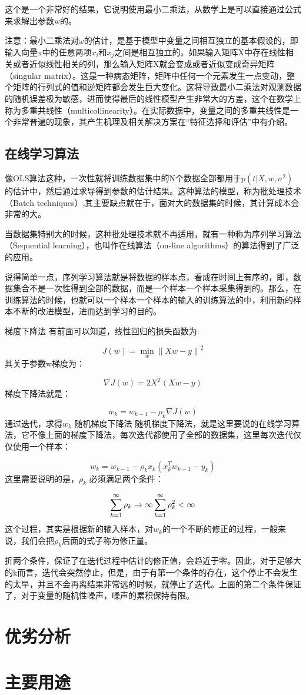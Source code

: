 \documentclass[12pt,a4paper,draft]{ctexart}
\begin{document}
这个是一个非常好的结果，它说明使用最小二乘法，从数学上是可以直接通过公式来求解出参数w的。

注意：最小二乘法对$ \omega $的估计，是基于模型中变量之间相互独立的基本假设的，即输入向量x中的任意两项$ x_{i} $和$ x_{j} $之间是相互独立的。如果输入矩阵X中存在线性相关或者近似线性相关的列，那么输入矩阵X就会变成或者近似变成奇异矩阵（singular matrix）。这是一种病态矩阵，矩阵中任何一个元素发生一点变动，整个矩阵的行列式的值和逆矩阵都会发生巨大变化。这将导致最小二乘法对观测数据的随机误差极为敏感，进而使得最后的线性模型产生非常大的方差，这个在数学上称为多重共线性（multicollinearity）。在实际数据中，变量之间的多重共线性是一个非常普遍的现象，其产生机理及相关解决方案在“特征选择和评估”中有介绍。
\subsection{在线学习算法}
像OLS算法这种，一次性就将训练数据集中的N个数据全部都用于$ p(t|X,w,\sigma^2) $的估计中，然后通过求导得到参数的估计结果。这种算法的模型，称为批处理技术（Batch techniques）,其主要缺点就在于，面对大的数据集的时候，其计算成本会非常的大。

当数据集特别大的时候，这种批处理技术就不再适用，就有一种称为序列学习算法（Sequential learning），也叫作在线算法（on-line algorithms）的算法得到了广泛的应用。

说得简单一点，序列学习算法就是将数据的样本点，看成在时间上有序的，即，数据集合不是一次性得到全部的数据，而是一个样本一个样本采集得到的。那么，在训练算法的时候，也就可以一个样本一个样本的输入的训练算法的中，利用新的样本不断的改进模型，进而达到学习的目的。

梯度下降法
有前面可以知道，线性回归的损失函数为:

\[ J(w)=\min_{w}\left \| Xw-y \right \|^{2} \]
其关于参数w梯度为：

\[ \nabla J(w)=2X^T(Xw-y) \]
梯度下降法就是：

\[ w_{k} = w_{k-1}- \rho_{k} \nabla J(w) \]
通过迭代，求得$ w_{k} $
随机梯度下降法
随机梯度下降法，就是这里要说的在线学习算法，它不像上面的梯度下降法，每次迭代都使用了全部的数据集，这里每次迭代仅仅使用一个样本：

\[ w_{k} = w_{k-1}- \rho_{k} x_{k}(x_{k}^Tw_{k-1} - y_{k}) \]
这里需要说明的是，$ \rho_{k} $ 必须满足两个条件：

\[ \sum_{k=1}^{\infty}\rho_{k}\to\infty \\
\sum_{k=1}^{\infty}\rho_{k}^2 < \infty \]
这个过程，其实是根据新的输入样本，$ 对w_{k} $的一个不断的修正的过程，一般来说，我们会把$ \rho_{k}$后面的式子称为修正量。

折两个条件，保证了在迭代过程中估计的修正值，会趋近于零。因此，对于足够大的k而言，迭代会突然停止，但是，由于有第一个条件的存在，这个停止不会发生的太早，并且不会再离结果非常远的时候，就停止了迭代。上面的第二个条件保证了，对于变量的随机性噪声，噪声的累积保持有限。

\section{优劣分析}
\section{主要用途}
\end{document}

